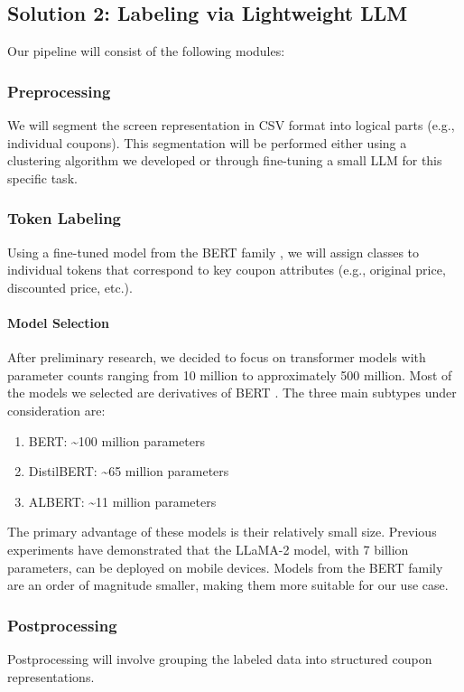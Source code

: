\documentclass[12pt]{article}
\begin{document}
\subsection*{Solution 2: Labeling via Lightweight LLM}
Our pipeline will consist of the following modules:

\subsubsection*{Preprocessing}
We will segment the screen representation in CSV format into logical parts (e.g., individual coupons). This segmentation will be performed either using a clustering algorithm we developed or through fine-tuning a small LLM for this specific task.

\subsubsection*{Token Labeling}
Using a fine-tuned model from the BERT family \cite{devlin2019bertpretrainingdeepbidirectional}, we will assign classes to individual tokens that correspond to key coupon attributes (e.g., original price, discounted price, etc.).

\paragraph{Model Selection}
After preliminary research, we decided to focus on transformer models with parameter counts ranging from 10 million to approximately 500 million. Most of the models we selected are derivatives of BERT \cite{devlin2019bertpretrainingdeepbidirectional}. The three main subtypes under consideration are:

\begin{enumerate}
    \item BERT: \textasciitilde100 million parameters
    \item DistilBERT: \textasciitilde65 million parameters
    \item ALBERT: \textasciitilde11 million parameters
\end{enumerate}

The primary advantage of these models is their relatively small size. Previous experiments \cite{LLMmobile2024} have demonstrated that the LLaMA-2 model, with 7 billion parameters, can be deployed on mobile devices. Models from the BERT family are an order of magnitude smaller, making them more suitable for our use case.

\subsubsection*{Postprocessing}
Postprocessing will involve grouping the labeled data into structured coupon representations.
\end{document}
